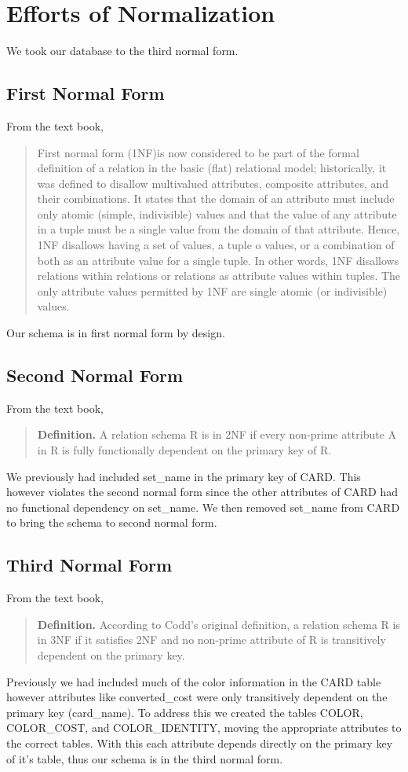 \documentclass{article}
\begin{document}
\section{Efforts of Normalization}
We took our database to the third normal form.
\subsection{First Normal Form}
From the text book,
\begin{quote}
    First normal form (1NF)is now considered to be part of the formal definition of a relation in the basic (flat) relational model; historically, it was defined to disallow multivalued attributes, composite attributes, and their combinations.
    It states that the domain of an attribute must include only atomic (simple, indivisible) values and that the value of any attribute in a tuple must be a single value from the domain of that attribute.
    Hence, 1NF disallows having a set of values, a tuple o values, or a combination of both as an attribute value for a single tuple.
    In other words, 1NF disallows relations within relations or relations as attribute values within tuples. 
    The only attribute values permitted by 1NF are single atomic (or indivisible) values.
\end{quote}
Our schema is in first normal form by design.
\subsection{Second Normal Form}
From the text book,
\begin{quote}
    \textbf{Definition.} A relation schema R is in 2NF if every non-prime attribute A in R is fully functionally dependent on the primary key of R.
\end{quote}
We previously had included set\_name in the primary key of CARD.
This however violates the second normal form since the other attributes of CARD had no functional dependency on set\_name.
We then removed set\_name from CARD to bring the schema to second normal form.
\subsection{Third Normal Form}
From the text book,
\begin{quote}
    \textbf{Definition.} According to Codd’s original definition, a relation schema R is in 3NF if it satisfies 2NF and no non-prime attribute of R is transitively dependent on the primary key.
\end{quote}
Previously we had included much of the color information in the CARD table however attributes like converted\_cost were only transitively dependent on the primary key (card\_name).
To address this we created the tables COLOR, COLOR\_COST, and COLOR\_IDENTITY, moving the appropriate attributes to the correct tables.
With this each attribute depends directly on the primary key of it's table, thus our schema is in the third normal form. 
\end{document}

